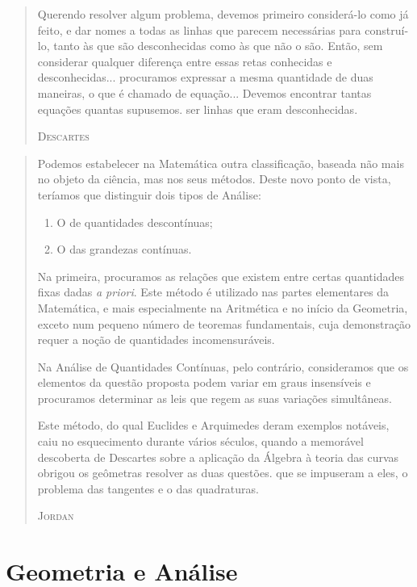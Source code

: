 \documentclass{hipatia}
\begin{document}
\begin{quote}
    Querendo resolver algum problema, devemos primeiro considerá-lo como já feito, e dar nomes a todas as linhas que parecem necessárias para construí-lo, tanto às que são desconhecidas como às que não o são. Então, sem considerar qualquer diferença entre essas retas conhecidas e desconhecidas... procuramos expressar a mesma quantidade de duas maneiras, o que é chamado de equação... Devemos encontrar tantas equações quantas supusemos. ser linhas que eram desconhecidas.

\hfill \textsc{Descartes}
\end{quote} 


\begin{quote}
Podemos estabelecer na Matemática outra classificação, baseada não mais no objeto da ciência, mas nos seus métodos. Deste novo ponto de vista, teríamos que distinguir dois tipos de Análise:

\begin{enumerate}
\item O de quantidades descontínuas;
\item O das grandezas contínuas.
\end{enumerate}

Na primeira, procuramos as relações que existem entre certas quantidades fixas dadas \emph{a priori}. Este método é utilizado nas partes elementares da Matemática, e mais especialmente na Aritmética e no início da Geometria, exceto num pequeno número de teoremas fundamentais, cuja demonstração requer a noção de quantidades incomensuráveis.

Na Análise de Quantidades Contínuas, pelo contrário, consideramos que os elementos da questão proposta podem variar em graus insensíveis e procuramos determinar as leis que regem as suas variações simultâneas.

Este método, do qual Euclides e Arquimedes deram exemplos notáveis, caiu no esquecimento durante vários séculos, quando a memorável descoberta de Descartes sobre a aplicação da Álgebra à teoria das curvas obrigou os geômetras resolver as duas questões. que se impuseram a eles, o problema das tangentes e o das quadraturas.

\hfill \textsc{Jordan}
\end{quote}

\section{Geometria e Análise}
\end{document}
